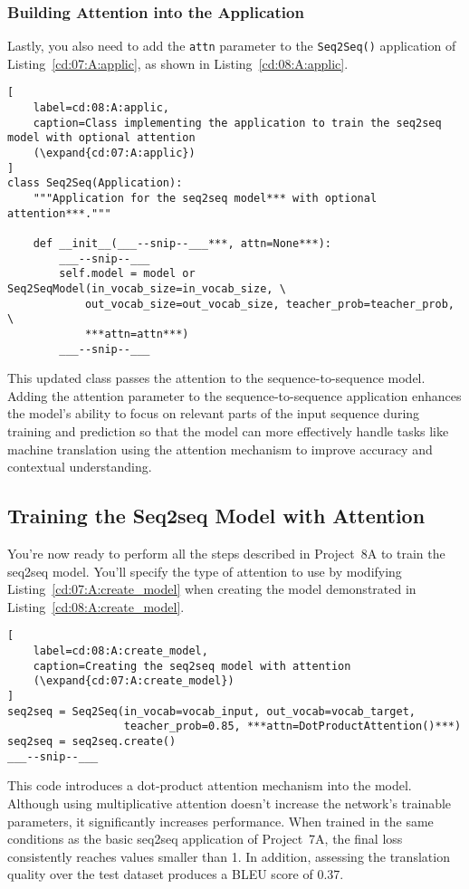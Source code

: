 \subsubsection{Building Attention into the Application}

Lastly, you also need to add the \lstinline{attn} parameter to the \lstinline{Seq2Seq()} application of Listing~\ref{cd:07:A:applic}, as shown in Listing~\ref{cd:08:A:applic}.
\begin{lstlisting}[
    label=cd:08:A:applic,
    caption=Class implementing the application to train the seq2seq model with optional attention 
    (\expand{cd:07:A:applic})
]
class Seq2Seq(Application):
    """Application for the seq2seq model*** with optional attention***."""

    def __init__(___--snip--___***, attn=None***):
        ___--snip--___
        self.model = model or Seq2SeqModel(in_vocab_size=in_vocab_size, \
            out_vocab_size=out_vocab_size, teacher_prob=teacher_prob, \
            ***attn=attn***)
        ___--snip--___
\end{lstlisting}
This updated class passes the attention to the sequence-to-sequence model.
Adding the attention parameter to the sequence-to-sequence application enhances the model's ability to focus on relevant parts of the input sequence during training and prediction so that the model can more effectively handle tasks like machine translation using the attention mechanism to improve accuracy and contextual understanding.

\subsection{Training the Seq2seq Model with Attention}

You're now ready to perform all the steps described in Project~8A to train the seq2seq model. You'll specify the type of attention to use by modifying Listing~\ref{cd:07:A:create_model} when creating the model demonstrated in Listing~\ref{cd:08:A:create_model}.
\begin{lstlisting}[
    label=cd:08:A:create_model,
    caption=Creating the seq2seq model with attention
    (\expand{cd:07:A:create_model})
]
seq2seq = Seq2Seq(in_vocab=vocab_input, out_vocab=vocab_target, 
                  teacher_prob=0.85, ***attn=DotProductAttention()***)
seq2seq = seq2seq.create()
___--snip--___
\end{lstlisting}
This code introduces a dot-product attention mechanism into the model. Although using multiplicative attention doesn't increase the network's trainable parameters, it significantly increases performance. When trained in the same conditions as the basic seq2seq application of Project~7A, the final loss consistently reaches values smaller than 1. In addition, assessing the translation quality over the test dataset produces a BLEU score of 0.37. 

